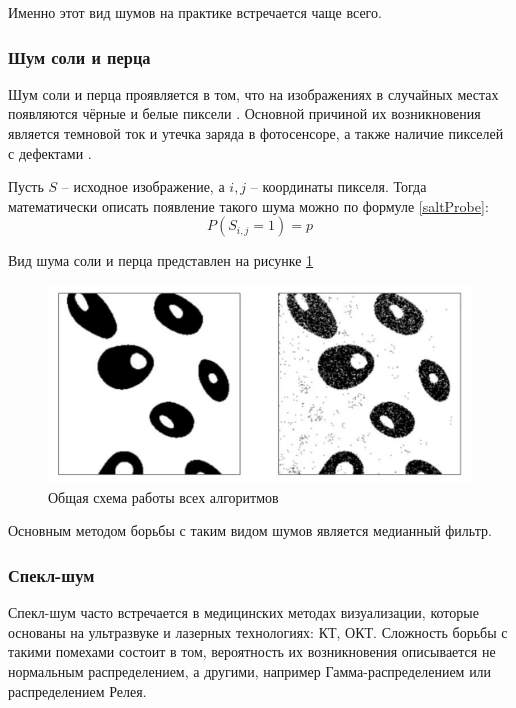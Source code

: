 Именно этот вид шумов на практике встречается чаще всего. 

\subsubsection{Шум соли и перца}
Шум соли и перца проявляется в том, что на изображениях в случайных местах появляются чёрные и белые пиксели \cite{moments}.
Основной причиной их возникновения является темновой ток и утечка заряда в фотосенсоре, а также наличие пикселей с дефектами \cite{shum}.

Пусть $S$ -- исходное изображение, а $i, j$ -- координаты пикселя. 
Тогда математически описать появление такого шума можно по формуле \ref{saltProbe}: 
\begin{equation}
	\label{saltProbe}
	P(S_{i, j} = 1) = p
\end{equation}

Вид шума соли и перца представлен на рисунке \ref{fig::salt}
\FloatBarrier
\begin{figure}[h]	
	\begin{center}
		\includegraphics[width=\linewidth]{inc/png/salt.png}
	\end{center}
	\captionsetup{justification=centering}
	\caption{Общая схема работы всех алгоритмов}
	\label{fig::salt}
\end{figure}
\FloatBarrier

Основным методом борьбы с таким видом шумов является медианный фильтр.

\subsubsection{Спекл-шум}
Спекл-шум часто встречается в медицинских методах визуализации, которые основаны на ультразвуке и лазерных технологиях: КТ, ОКТ.
Сложность борьбы с такими помехами состоит в том, вероятность их возникновения описывается не нормальным распределением, а другими, например Гамма-распределением или распределением Релея.

